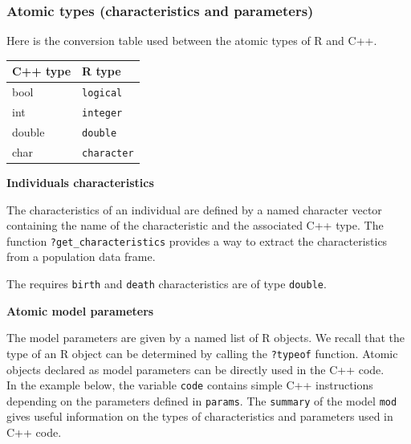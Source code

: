 \hypertarget{atomic-types-characteristics-and-parameters}{%
\subsubsection{Atomic types (characteristics and parameters)}\label{atomic-types-characteristics-and-parameters}}

Here is the conversion table used between the atomic types of R and C++.

\begin{longtable}[]{@{}ll@{}}
\toprule()
C++ type & R type \\
\midrule()
\endhead
bool & \texttt{logical} \\
int & \texttt{integer} \\
double & \texttt{double} \\
char & \texttt{character} \\
\bottomrule()
\end{longtable}

\textbf{Individuals characteristics}

The characteristics of an individual are defined by a named character vector containing the name of the characteristic and the associated C++ type. The function \texttt{?get\_characteristics} provides a way to extract the characteristics from a population data frame.

\begin{Shaded}
\begin{Highlighting}[]
\OtherTok{\textless{}{-}}\SpecialCharTok{::}\SpecialCharTok{$}
\end{Highlighting}
\end{Shaded}

The requires \texttt{birth} and \texttt{death} characteristics are of type \texttt{double}.

\textbf{Atomic model parameters}

The model parameters are given by a named list of R objects. We recall that the type of an R object can be determined by calling the \texttt{?typeof} function. Atomic objects declared as model parameters can be directly used in the C++ code.\\
In the example below, the variable \texttt{code} contains simple C++ instructions depending on the parameters defined in \texttt{params}. The \texttt{summary} of the model \texttt{mod} gives useful information on the types of characteristics and parameters used in C++ code.

